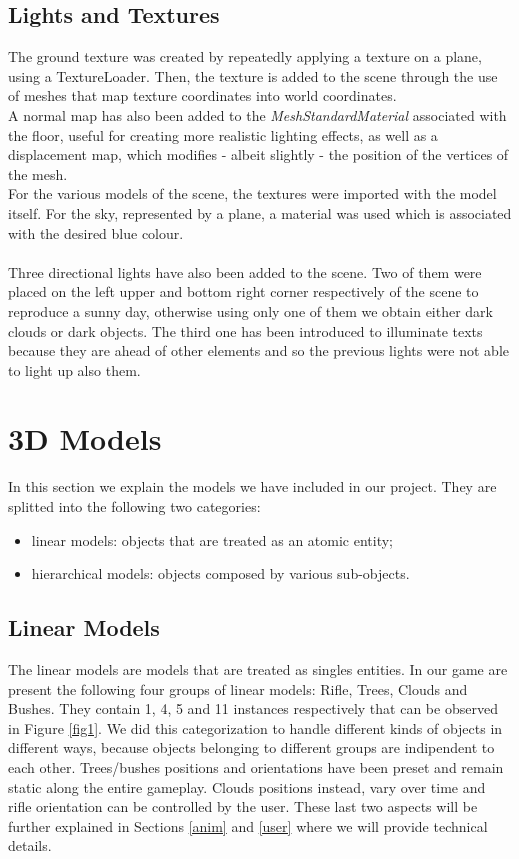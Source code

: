 \documentclass[12pt,a4paper]{article}
\begin{document}
\subsection{Lights and Textures}
The ground texture was created by repeatedly applying a texture on 
a plane, using a TextureLoader. Then, the texture is added to the
scene through the use of meshes that map texture coordinates into
world coordinates.\\
A normal map has also been added to the \textit{MeshStandardMaterial} associated with the floor, useful for creating more realistic lighting effects, as well as a displacement map, which modifies - albeit slightly - the position of the vertices of the mesh.\\
For the various models of the scene, the textures were imported with the model itself. For the sky, represented by a plane, a material was used which is associated with the desired blue colour.\\\\
Three directional lights have also been added to the scene. 
Two of them were placed on the left upper and bottom right corner 
respectively of the scene to reproduce a sunny day, otherwise using
only one of them we obtain either dark clouds or dark objects. 
The third one has been introduced to illuminate texts because they 
are ahead of other elements and so the previous lights were
not able to light up also them.
\section{3D Models}
In this section we explain the models we have included in our project. They are splitted into
the following two categories: 
\begin{itemize}
\item linear models: objects that are treated as an atomic entity;
\item hierarchical models: objects composed by various sub-objects. 
\end{itemize}
\subsection{Linear Models} \label{linear}
The linear models are models that are treated as singles entities. In our game are present the following four groups of linear models: Rifle, Trees, Clouds and Bushes. They contain 1, 4, 5 and 11 instances respectively that can be observed in Figure \ref{fig1}. We did this categorization to handle different kinds of objects in different ways, because objects belonging to different groups are indipendent to each other. Trees/bushes positions and orientations have been preset and remain static along the entire gameplay. Clouds positions instead, vary over time and rifle orientation can be controlled by the user. These last two aspects will be further explained in Sections \ref{anim} and \ref{user} where we will provide technical details.
\end{document}
